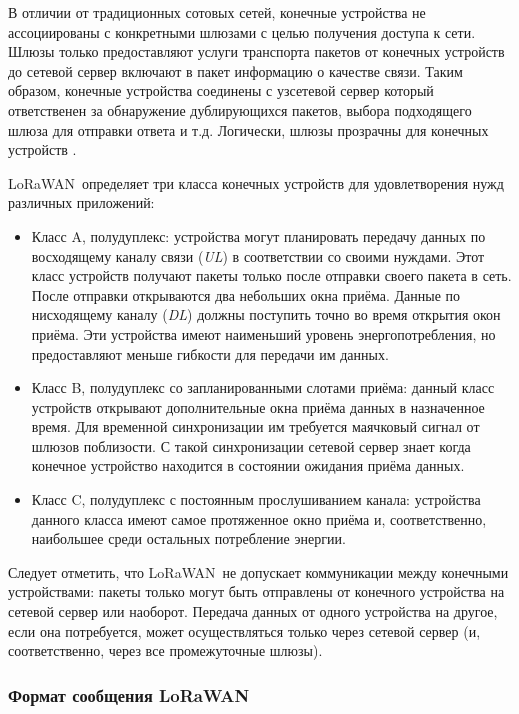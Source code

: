 В отличии от традиционных сотовых сетей, конечные устройства не ассоциированы с 
конкретными шлюзами с целью получения доступа к сети.
Шлюзы только предоставляют услуги транспорта пакетов от конечных устройств до 
сетевой сервер включают в пакет информацию о качестве связи. 
Таким образом, конечные устройства соединены с узсетевой сервер который 
ответственен за обнаружение дублирующихся пакетов, выбора подходящего шлюза для 
отправки ответа и т.д.
Логически, шлюзы прозрачны для конечных устройств \cite{augustin2016}.

LoRaWAN\texttrademark~определяет три класса конечных устройств для 
удовлетворения нужд различных приложений:
\begin{itemize}
 \item Класс A, полудуплекс: устройства могут планировать передачу данных по 
восходящему каналу связи (\textit{UL}) в соответствии со своими нуждами. Этот 
класс устройств получают пакеты только после отправки своего пакета в сеть. 
После отправки открываются два небольших окна приёма. Данные по нисходящему 
каналу (\textit{DL}) должны поступить точно во время открытия окон приёма. Эти 
устройства имеют наименьший уровень энергопотребления, но предоставляют меньше 
гибкости для передачи им данных.
 \item Класс B, полудуплекс со запланированными слотами приёма: данный класс 
устройств открывают дополнительные окна приёма данных в назначенное время. Для 
временной синхронизации им требуется маячковый сигнал от шлюзов поблизости. С 
такой синхронизации сетевой сервер знает когда конечное устройство находится в 
состоянии ожидания приёма данных.
 \item Класс C, полудуплекс с постоянным прослушиванием канала: устройства 
данного класса имеют самое протяженное окно приёма и, соответственно, 
наибольшее среди остальных потребление энергии.
\end{itemize}

Следует отметить, что LoRaWAN\texttrademark~не допускает коммуникации между 
конечными устройствами: пакеты только могут быть отправлены от конечного 
устройства на сетевой сервер или наоборот. 
Передача данных от одного устройства на другое, если она потребуется, может 
осуществляться только через сетевой сервер (и, соответственно, через все 
промежуточные шлюзы).

\subsubsection{Формат сообщения LoRaWAN\texttrademark} 

